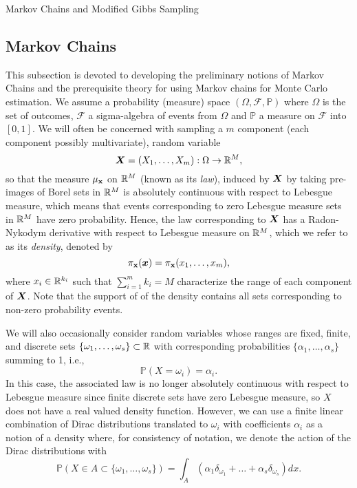 \begin{chapter}{Markov Chains and Modified Gibbs Sampling}
  \subsection{Markov Chains}
This subsection is devoted to developing the preliminary notions of Markov Chains and the prerequisite theory for using Markov chains for Monte Carlo estimation. 
We assume a probability (measure) space $(\Omega,\mathcal F,\mathbb P)$ where $\Omega$ is the set of outcomes, $\mathcal F$ a sigma-algebra of events from $\Omega$ and $\mathbb P$ a measure on $\mathcal F$ into $[0,1]$.
We will often be concerned with sampling a $m$ component (each component possibly multivariate), random variable 
\begin{equation}
\mbox{\boldmath$X$} = (X_1,\dots,X_m):\Omega \to \mathbb R^M,
\end{equation} 
  so that the measure $\mu_{\textsc{\bf{x}}}$ on $\mathbb R^M$ (known as its \emph{law}), induced by $\mbox{\boldmath$X$}$ by taking pre-images of Borel sets in $\mathbb R^M$ is absolutely continuous with respect to Lebesgue measure, which means that events corresponding to zero Lebesgue measure sets in $\mathbb R^M$ have zero probability.
Hence, the law corresponding to $\mbox{\boldmath$X$}$ has a Radon-Nykodym derivative with respect to Lebesgue measure on $\mathbb R^M$, which we refer to as its \emph{density}, denoted by 
\begin{equation}
  \pi_{\textsc{\bf{x}}}(\mbox{\boldmath$x$}) = \pi_{\textsc{\bf{x}}}(x_1,\dots,x_m),
\end{equation} where $x_i \in \mathbb R^{k_i}$ such that $\sum_{i=1}^m k_i = M$ characterize the range of each component of $\mbox{\boldmath$X$}$.
Note that the support of of the density contains all sets corresponding to non-zero probability events.

We will also occasionally consider random variables whose ranges are fixed, finite, and discrete sets $\{\omega_1,\dots,\omega_s\} \subset \mathbb R$ with corresponding probabilities $\{\alpha_1,\dots,\alpha_s\}$ summing to 1, i.e.,
\begin{equation} 
  \mathbb P( X = \omega_i ) = \alpha_i.
\end{equation}
In this case, the associated law is no longer absolutely continuous with respect to Lebesgue measure since finite discrete sets have zero Lebesgue measure, so $X$ does not have a real valued density function.
However, we can use a finite linear combination of Dirac distributions translated to $\omega_i$ with coefficients $\alpha_i$ as a notion of a density where, for consistency of notation, we denote the action of the Dirac distributions with
\begin{equation} \label{eq:diracMeasure}
  \mathbb P( X \in A \subset \{\omega_1,\dots,\omega_s\} ) =  \int_A \left(\alpha_1 \delta_{\omega_1}+\dots+\alpha_s \delta_{\omega_s}\right) dx.
\end{equation}


\end{chapter}
